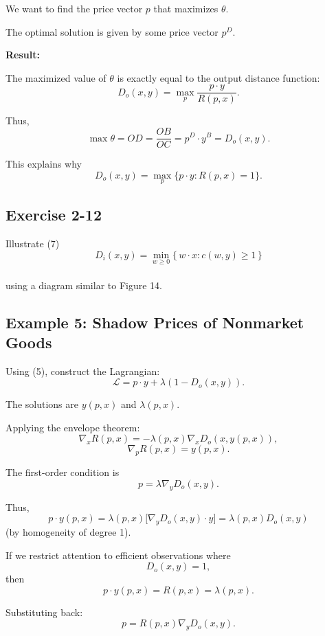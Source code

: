 We want to find the price vector $p$ that maximizes $\theta$.

The optimal solution is given by some price vector $p^D$.

\medskip

\textbf{Result:}

The maximized value of $\theta$ is exactly equal to the output distance function:
\[
D_o(x,y)=\max_p \frac{p\cdot y}{R(p,x)}.
\]




Thus,
\[
\max \theta = OD = \frac{OB}{OC} = p^D \cdot y^B = D_o(x,y).
\]

This explains why
\[
D_o(x,y)=\max_p \{p\cdot y : R(p,x)=1\}.
\]

\begin{tcolorbox}[breakable]

\subsection*{Exercise 2-12}

Illustrate (7) 
\[
D_i(x,y)=\min_{w \ge 0}\{\,w \cdot x : c(w,y)\ge 1\,\}
\]\\
using a diagram similar to Figure 14.

\end{tcolorbox}


\subsection*{Example 5: Shadow Prices of Nonmarket Goods}

Using (5), construct the Lagrangian:
\[
\mathcal{L}=p\cdot y + \lambda(1 - D_o(x,y)).
\]

The solutions are $y(p,x)$ and $\lambda(p,x)$.

Applying the envelope theorem:
\[
\nabla_x R(p,x)
=
-\lambda(p,x)\nabla_x D_o(x,y(p,x)),
\]
\[
\nabla_p R(p,x)=y(p,x).
\]

The first-order condition is
\[
p = \lambda \nabla_y D_o(x,y).
\]

Thus,
\[
p\cdot y(p,x)
=
\lambda(p,x)\bigl[\nabla_y D_o(x,y)\cdot y\bigr]
=
\lambda(p,x) D_o(x,y)
\]
(by homogeneity of degree 1).

If we restrict attention to efficient observations where
\[
D_o(x,y)=1,
\]
then
\[
p\cdot y(p,x)=R(p,x)=\lambda(p,x).
\]

Substituting back:
\[
p = R(p,x)\nabla_y D_o(x,y).
\]

\medskip


